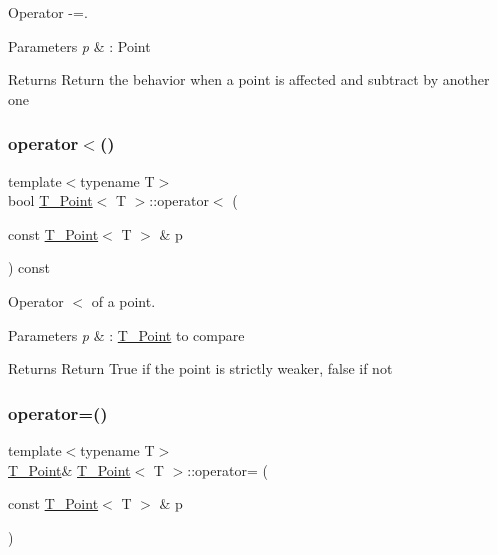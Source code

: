 Operator -\/=. 


\begin{DoxyParams}{Parameters}
{\em p} & \+: Point \\
\hline
\end{DoxyParams}
\begin{DoxyReturn}{Returns}
Return the behavior when a point is affected and subtract by another one 
\end{DoxyReturn}
\mbox{\label{classT__Point_a95cb559fe5888b44481f6ad3aebabefe}} 
\subsubsection{\texorpdfstring{operator$<$()}{operator<()}}
{\footnotesize\ttfamily template$<$typename T$>$ \\
bool \hyperlink{classT__Point}{T\+\_\+\+Point}$<$ T $>$\+::operator$<$ (\begin{DoxyParamCaption}\item[{const \hyperlink{classT__Point}{T\+\_\+\+Point}$<$ T $>$ \&}]{p }\end{DoxyParamCaption}) const\hspace{0.3cm}{\ttfamily [inline]}}



Operator $<$ of a point. 


\begin{DoxyParams}{Parameters}
{\em p} & \+: \hyperlink{classT__Point}{T\+\_\+\+Point} to compare \\
\hline
\end{DoxyParams}
\begin{DoxyReturn}{Returns}
Return True if the point is strictly weaker, false if not 
\end{DoxyReturn}
\mbox{\label{classT__Point_a13fbb5646f2333aa41194d648423e10f}} 
\subsubsection{\texorpdfstring{operator=()}{operator=()}}
{\footnotesize\ttfamily template$<$typename T$>$ \\
\hyperlink{classT__Point}{T\+\_\+\+Point}\& \hyperlink{classT__Point}{T\+\_\+\+Point}$<$ T $>$\+::operator= (\begin{DoxyParamCaption}\item[{const \hyperlink{classT__Point}{T\+\_\+\+Point}$<$ T $>$ \&}]{p }\end{DoxyParamCaption})\hspace{0.3cm}{\ttfamily [inline]}}



